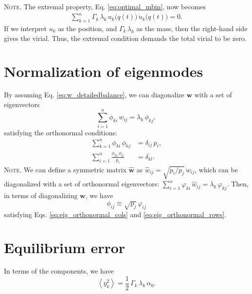 \documentclass[reprint, floatfix]{revtex4-1}
\newcommand{\note}[1]{{\color{DarkGreen}\footnotesize \textsc{Note.} #1}}
\begin{document}
\note{
  The extremal property, Eq. \eqref{eq:optimal_mbin},
  now becomes
  \begin{align}
    \sum_{k = 1}^n
      \Gamma_k \, \lambda_k \,
      u_k\bigl( q(t) \bigr) \,
      \ddot u_k\bigl( q(t) \bigr) = 0
    .
    \tag{N2}
    \label{neq:optimal_mbin1}
  \end{align}
  If we interpret $u_k$ as the position,
  and $\Gamma_k \, \lambda_k$ as the mass,
  then the right-hand side gives the virial.
  Thus, the extremal condition demands
  the total virial to be zero.
  $$\,$$
}%


\section{Normalization of eigenmodes}



By assuming Eq. \eqref{eq:w_detailedbalance},
we can diagonalize $\mathbf w$ with a set of
eigenvectors
%
\begin{equation}
  \sum_{i = 1}^n \phi_{ki} \, w_{ij}
  =
  \lambda_k \, \phi_{kj}
  ,
\label{eq:eig_w}
\end{equation}
%
satisfying the orthonormal conditions\cite{vankampen}:
%
\begin{align}
  \sum_{k = 1}^n
    \phi_{ki} \, \phi_{kj}
  &=
  \delta_{ij} \, p_i,
  \label{eq:eig_orthonormal_cols}
  \\
  \sum_{i = 1}^n
    \frac{ \phi_{ki} \, \phi_{li} }
         { p_i }
  &=
  \delta_{kl}
  .
\label{eq:eig_orthonormal_rows}
\end{align}
%
\note{We can define a symmetric matrix $\hat{\mathbf w}$
as $\hat w_{ij} = \sqrt{p_i/p_j} \, w_{ij}$,
which can be diagonalized\cite{vankampen}
with a set of orthonormal eigenvectors:
%
$\sum_{i = 1}^n \varphi_{ki} \, \hat w_{ij} = \lambda_k \, \varphi_{kj}$.
%
Then,
in terms of diagonalizing $\mathbf w$, we have
$$\phi_{ij} \equiv \sqrt{p_j} \, \varphi_{ij}$$
satisfying Eqs. \eqref{eq:eig_orthonormal_cols}
and \eqref{eq:eig_orthonormal_rows}.
%
}%


\section{Equilibrium error}


In terms of the components, we have
%
\begin{equation}
  \left\langle
    y_k^2
  \right\rangle
  =
  \frac 1 2 \, \Gamma_k \, \lambda_k \, \alpha_0.
  \label{eq:y2_eql}
\end{equation}
%
\end{document}
